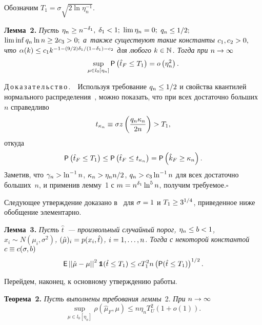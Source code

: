 \begin{multicols}{2}
\smallskip


Обозначим $T_1 = \sigma\sqrt{2\ln \eta_n^{-1}}$.

\smallskip

\noindent
\textbf{Лемма~2.}
\textit{Пусть $\eta_n\hm\geq n^{-\delta_1},$ $\delta_1\hm<1;$ $\mathrm{lim}\,\eta_n\hm=0;$ $q_n\hm\leq 1/2;$ 
$\liminf q_n \ln n \hm\geq 2 c_3 > 0;$ а~также существуют такие константы $c_1, 
c_2\hm>0,$ что $\alpha(k) \hm\leq c_1 k^{-1-(9/2)\delta_1/(1\hm-\delta_1)\hm-c_2}$ для 
любого $k\hm\in\mathbb{N}$. Тогда при} $n\hm\to\infty$
$$
\sup\limits_{\mu\in l_0 [\eta_n]} {\sf P}\left(\hat{t}_F \leq T_1\right) = o\left(\eta_n^2\right).
$$


\noindent
Д\,о\,к\,а\,з\,а\,т\,е\,л\,ь\,с\,т\,в\,о\,.\ \ Используя требование $q_n\hm\leq1/2$ и свойства 
квантилей нормального распределения~\cite{AdaptingFDR}, можно показать, что при 
всех достаточно больших~$n$ справедливо 
$$
t_{\kappa_n}\equiv \sigma z\left( \displaystyle\frac{\displaystyle q_n \kappa_n\mathstrut}{\displaystyle 2n\mathstrut}\right) > T_1,
$$
 откуда
$$
{\sf P}\left(\hat{t}_F \leq T_1\right) \leq {\sf P}\left(\hat{t}_F \leq 
t_{\kappa_n}\right) = {\sf P} \left(\hat{k}_F \geq \kappa_n \right).
$$
Заметив, что $\gamma_n \hm> \ln^{-1} n$, $\kappa_n \hm> \eta_n n/2$, $q_n \hm> c_3 \ln^{-1} n$ 
для всех достаточно больших~$n$, и применив лемму~1 с $m\hm= n^{\delta_1} \ln^5 n$, получим требуемое.\hfill$\square$

\smallskip

Следующее утверждение доказано в~\cite{AdaptingFDR} для $\sigma\hm=1$ и $T_1 \hm\geq 
3^{1/4}$, приведенное ниже обобщение элементарно.


\smallskip

\noindent
\textbf{Лемма~3.}
\textit{
Пусть $\hat{t}$~--- произвольный случайный порог, $\eta_n\hm\leq b\hm<1$, $x_i\sim 
N(\mu_i, \sigma^2)$, $(\hat{\mu})_i \hm= p(x_i, \hat{t})$, $i\hm=1,\ldots,n$. Тогда с 
некоторой константой} $c \hm\equiv c(\sigma, b)$
$$
{\sf E} \left|\left| \hat{\mu} - \mu\right|\right|^2 \mbox{{{\tt 1}}\hspace{-1.3mm}{\sf 1}}(\hat{t}\leq T_1) \leq c 
 T_1^2  n \left({\sf P} (\hat{t}\leq T_1)\right)^{1/2}.
$$



Перейдем, наконец, к основному утверждению работы.


\smallskip

\noindent
\textbf{Теорема~2.}
\textit{Пусть выполнены требования леммы}~2. \textit{При} $n\hm\to\infty$
$$
\sup\limits_{\mu\in l_0[\eta_n]}\rho(\hat{\mu}_F, \mu)  \leq n \eta_n T_U^2 (1+o(1)).
$$



\end{multicols}
